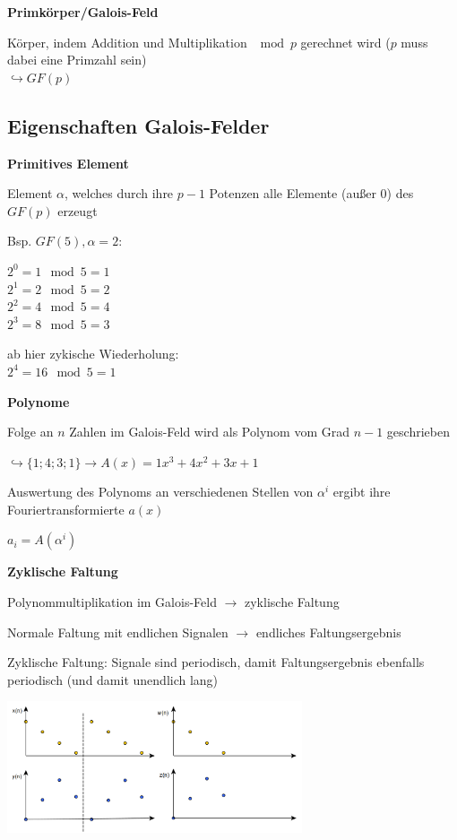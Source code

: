 \textbf{Primkörper/Galois-Feld}

Körper, indem Addition und Multiplikation $\mod p$ gerechnet wird ($p$ muss dabei eine Primzahl sein)\\
$\hookrightarrow GF(p)$

\subsection{Eigenschaften Galois-Felder}

\textbf{Primitives Element}

Element $\alpha$, welches durch ihre $p-1$ Potenzen alle Elemente (außer $0$) des $GF(p)$ erzeugt

Bsp. $GF(5), \alpha = 2$:

$2^0 = 1 \mod 5 = 1$\\
$2^1 = 2 \mod 5 = 2$\\
$2^2 = 4 \mod 5 = 4$\\
$ 2^3 = 8 \mod 5 = 3$

ab hier zykische Wiederholung:\\
$2^4 = 16 \mod 5 = 1$

\textbf{Polynome}

Folge an $n$ Zahlen im Galois-Feld wird als Polynom vom Grad $n-1$ geschrieben

$\displaystyle{
    \hookrightarrow \{ 1; 4; 3; 1 \} \rightarrow A(x) = 1x^3 + 4x^2 + 3x + 1
}$

Auswertung des Polynoms an verschiedenen Stellen von $\alpha^i$ ergibt ihre Fouriertransformierte $a(x)$

$\displaystyle{
    a_i = A(\alpha^i)
}$

\textbf{Zyklische Faltung}

Polynommultiplikation im Galois-Feld $\rightarrow$ zyklische Faltung

Normale Faltung mit endlichen Signalen $\rightarrow$ endliches Faltungsergebnis

Zyklische Faltung: Signale sind periodisch, damit Faltungsergebnis ebenfalls periodisch (und damit unendlich lang)

\includegraphics[width=8.7cm]{img/zykische_faltung.PNG}

